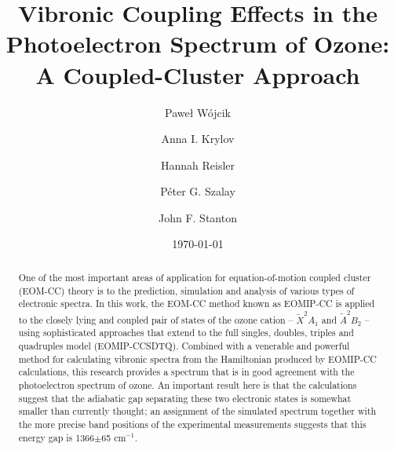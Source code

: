 \documentclass[12pt,a4paper,prb,aps,superscriptaddress]{revtex4}
\begin{document}
\title{Vibronic Coupling Effects in the Photoelectron Spectrum of Ozone: A
Coupled-Cluster Approach}

\author{Pawe{\l} W{\'o}jcik}

\author{Anna I. Krylov}

\author{Hannah Reisler}

\author{P{\'e}ter G. Szalay}

\author{John F. Stanton}

\date{\today}

\begin{abstract}
One of the most important areas of application for equation-of-motion coupled
cluster (EOM-CC) theory is to the prediction, simulation and analysis of
various types of electronic spectra.   In this work, the EOM-CC method known
as EOMIP-CC is applied to the closely lying and coupled pair of states of the
ozone cation -- ${\tilde X}^2A_1$ and ${\tilde A}^2B_2$ -- using sophisticated
approaches that extend to the full singles, doubles, triples and quadruples
model (EOMIP-CCSDTQ).   Combined with a venerable and powerful method for
calculating vibronic spectra from the Hamiltonian produced by EOMIP-CC
calculations, this research provides a spectrum that is in good agreement with
the photoelectron spectrum of ozone.   An important result here is that the
calculations suggest that the adiabatic gap separating these two electronic
states is somewhat smaller than currently thought; an assignment of the
simulated spectrum together with the more precise band positions of the
experimental measurements suggests that this energy gap is 1366$\pm$65
cm$^{-1}$.
\end{abstract}
\end{document}
